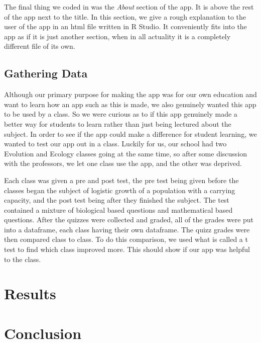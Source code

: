 \documentclass{article}\usepackage[]{graphicx}\usepackage[]{color}
\begin{document}
The final thing we coded in was the \textit{About} section of the app. It is above the rest of the app next to the title. In this section, we give a rough explanation to the user of the app in an html file written in R Studio. It conveniently fits into the app as if it is just another section, when in all actuality it is a completely different file of its own. 









\subsection{Gathering Data}

Although our primary purpose for making the app was for our own education and want to learn how an app such as this is made, we also genuinely wanted this app to be used by a class. So we were curious as to if this app genuinely made a better way for students to learn rather than just being lectured about the subject. In order to see if the app could make a difference for student learning, we wanted to test our app out in a class. Luckily for us, our school had two Evolution and Ecology classes going at the same time, so after some discussion with the professors, we let one class use the app, and the other was deprived. 

Each class was given a pre and post test, the pre test being given before the classes began the subject of logistic growth of a population with a carrying capacity, and the post test being after they finished the subject. The test contained a mixture of biological based questions and mathematical based questions. After the quizzes were collected and graded, all of the grades were put into a dataframe, each class having their own dataframe. The quizz grades were then compared class to class. To do this comparison, we used what is called a t test to find which class improved more. This should show if our app was helpful to the class.









\section{Results}













\section{Conclusion}
\end{document}
